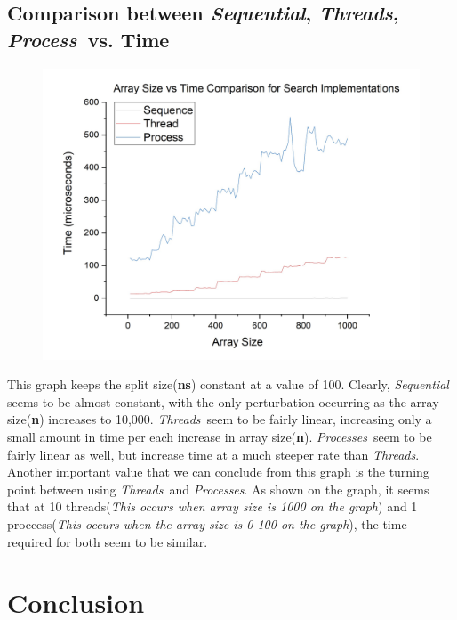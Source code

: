 \documentclass{article}
\begin{document}
            \subsection*{Comparison between \textit{Sequential}, \color{red}\textit{Threads}\color{black}, \color{blue}\textit{Process}\color{black}\ vs. Time}
                \begin{figure}[H]
                    \centering
                    \includegraphics[width=12cm]{svt-comparison-n100}
                \end{figure}
                This graph keeps the split size(\textbf{ns}) constant at a value of 100. 
                Clearly, \textit{Sequential} seems to be almost constant, with the only perturbation occurring as the array size(\textbf{n}) increases to 10,000.
                \color{red}\textit{Threads}\color{black}\ seem to be fairly linear, increasing only a small amount in time per each increase in array size(\textbf{n}).
                \color{blue}\textit{Processes}\color{black}\ seem to be fairly linear as well, but increase time at a much steeper rate than \color{red}\textit{Threads}\color{black}. \newline
                Another important value that we can conclude from this graph is the turning point between using \color{red}\textit{Threads}\color{black}\ and \color{blue}\textit{Processes}\color{black}.
                As shown on the graph, it seems that at 10 threads(\textit{This occurs when array size is 1000 on the graph}) and 1 proccess(\textit{This occurs when the array size is 0-100 on the graph}), the time required for both seem to be similar.
    \section{Conclusion}
\end{document}

